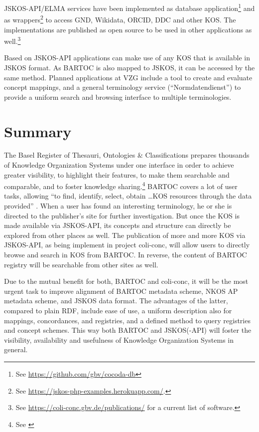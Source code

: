 \documentclass[12pt,a4paper]{llncs}
\begin{document}
JSKOS-API/ELMA services have been implemented as database application\footnote{See \url{https://github.com/gbv/cocoda-db}} and as wrappers\footnote{See \url{https://jskos-php-examples.herokuapp.com/}.} to access GND, Wikidata, ORCID, DDC and other KOS.  The implementations are published as open source to be used in other applications as well.\footnote{See \url{https://coli-conc.gbv.de/publications/} for a current list of software.}

Based on JSKOS-API applications can make use of any KOS that is available in JSKOS format. As BARTOC is also mapped to JSKOS, it can be accessed by the same method. Planned applications at VZG include a tool to create and evaluate concept mappings, and a 
general terminology service (``Normdatendienst'') to provide a uniform search and browsing interface to multiple terminologies.



\section{Summary}

The Basel Register of Thesauri, Ontologies \& Classifications prepares thousands of Knowledge Organization Systems under one interface in order to achieve greater visibility, to highlight their features, to make them searchable and comparable, and to foster knowledge sharing.\footnote{See \cite[20]{hlava2011developing}}
BARTOC covers a lot of user tasks, allowing ``to find, identify, select, obtain \ldots KOS resources through the data provided'' \cite[1906]{golub2014terminology}. When a user has found an interesting terminology, he or she is directed to the publisher's site for further investigation. But once the KOS is made available via JSKOS-API, its concepts and structure can directly be explored from other places as well. 
The publication of more and more KOS via JSKOS-API, as being implement in project coli-conc, will allow users to directly browse and search in KOS from BARTOC. In reverse, the content of BARTOC registry will be searchable from other sites as well. 

Due to the mutual benefit for both, BARTOC and coli-conc, it will be the most urgent task to improve alignment of BARTOC metadata scheme, NKOS AP metadata scheme, and JSKOS data format.
The advantages of the latter, compared to plain RDF, include ease of use, a uniform description also for mappings, concordances, and registries, and a defined method to query registries and concept schemes. This way both BARTOC and JSKOS(-API) will foster the visibility, availability and usefulness of Knowledge Organization Systems in general.



\end{document}
